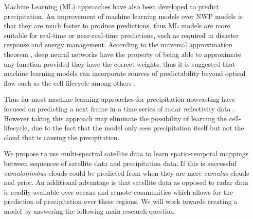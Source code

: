 \documentclass[acmtog, authorversion]{acmart}
\begin{document}
Machine Learning (\textsc{ML}) approaches have also been developed to predict precipitation. An improvement of machine learning models over \textsc{NWP} models is that they are much faster to produce predictions, thus ML models are more suitable for real-time or near-real-time predictions, such as required in disaster response and energy management. According to the universal approximation theorem \cite{cybenko-1989}, deep neural networks have the property of being able to approximate any function provided they have the correct weights, thus it is suggested that machine learning models can incorporate sources of predictability beyond optical flow such as the cell-lifecycle among others \cite{prudden2020review}.
\medskip

Thus far most machine learning approaches for precipitation nowcasting have focused on predicting a next frame in a time series of radar reflectivity data \cite{shi2017deep, convlstm, rainet}. However taking this approach may eliminate the possibility of learning the cell-lifecycle, due to the fact that the model only sees precipitation itself but not the cloud that is causing the precipitation.
\medskip


We propose to use multi-spectral satellite data to learn spatio-temporal mappings between sequences of satellite data and precipitation data. If this is successful \textit{cumulonimbus} clouds could be predicted from when they are mere \textit{cumulus} clouds and prior. An additional advantage is that satellite data as opposed to radar data is readily available over oceans and remote communities which allows for the prediction of precipitation over these regions. We will work towards creating a model by answering the following main research question:
\smallskip

\end{document}
